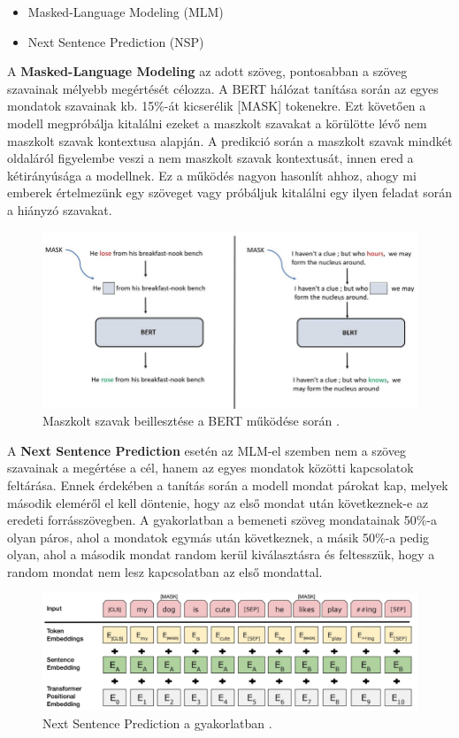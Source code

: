 \begin{itemize}
\item Masked-Language Modeling (MLM)
\item Next Sentence Prediction (NSP)
\end{itemize}

A \textbf{Masked-Language Modeling} az adott szöveg, pontosabban a szöveg szavainak mélyebb megértését célozza. A BERT hálózat tanítása során az egyes mondatok szavainak kb. 15\%-át kicserélik [MASK] tokenekre. Ezt követően a modell megpróbálja kitalálni ezeket a maszkolt szavakat a körülötte lévő nem maszkolt szavak kontextusa alapján. A predikció során a maszkolt szavak mindkét oldaláról figyelembe veszi a nem maszkolt szavak kontextusát, innen ered a kétirányúsága a modellnek. Ez a működés nagyon hasonlít ahhoz, ahogy mi emberek értelmezünk egy szöveget vagy próbáljuk kitalálni egy ilyen feladat során a hiányzó szavakat.

\begin{figure}[h]
\centering
\includegraphics[scale=0.4]{images/bert_mask.png}
\caption{Maszkolt szavak beillesztése a BERT működése során \cite{bert}.}
\label{fig:bert}
\end{figure}

A \textbf{Next Sentence Prediction} esetén az MLM-el szemben nem a szöveg szavainak a megértése a cél, hanem az egyes mondatok közötti kapcsolatok feltárása. Ennek érdekében a tanítás során a modell mondat párokat kap, melyek második eleméről el kell döntenie, hogy az első mondat után következnek-e az eredeti forrásszövegben. A gyakorlatban a bemeneti szöveg mondatainak 50\%-a olyan páros, ahol a mondatok egymás után következnek, a másik 50\%-a pedig olyan, ahol a második mondat random kerül kiválasztásra és feltesszük, hogy a random mondat nem lesz kapcsolatban az első mondattal.

\begin{figure}[h]
\centering
\includegraphics[scale=0.3]{images/next_sentence_prediction.png}
\caption{Next Sentence Prediction a gyakorlatban \cite{bert2}.}
\label{fig:bert2}
\end{figure}

